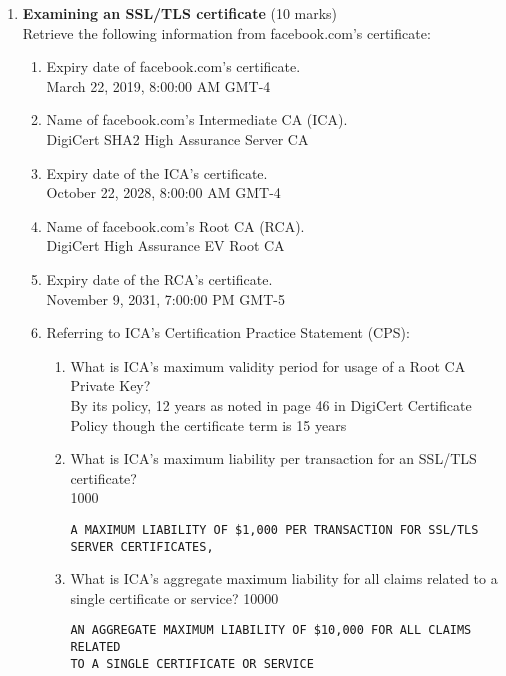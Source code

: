 \documentclass[11pt]{article}
\begin{document}
\begin{enumerate}
\begin{enumerate}
\end{enumerate}

\item {\bf Examining an SSL/TLS certificate} (10 marks)\\
Retrieve the following information from facebook.com's certificate:
\begin{enumerate}
\item Expiry date of facebook.com's certificate.\\
March 22, 2019, 8:00:00 AM GMT-4
\item Name of facebook.com's Intermediate CA (ICA).\\
DigiCert SHA2 High Assurance Server CA
\item Expiry date of the ICA's certificate.\\
October 22, 2028, 8:00:00 AM GMT-4
\item Name of facebook.com's Root CA (RCA).\\
DigiCert High Assurance EV Root CA
\item Expiry date of the RCA's certificate.\\
November 9, 2031, 7:00:00 PM GMT-5
\item Referring to ICA's Certification Practice Statement (CPS):
\begin{enumerate}
\item What is ICA's maximum validity period for usage of a Root CA Private Key?\\
By its policy, 12 years as noted in page 46 in DigiCert Certificate Policy though the certificate term is 15 years
\item What is ICA's maximum liability per transaction for an SSL/TLS
certificate?\\
1000
\begin{verbatim}
A MAXIMUM LIABILITY OF $1,000 PER TRANSACTION FOR SSL/TLS
SERVER CERTIFICATES,
\end{verbatim}

\item What is ICA's aggregate maximum liability for all claims related
to a single certificate or service?
10000
\begin{verbatim}
AN AGGREGATE MAXIMUM LIABILITY OF $10,000 FOR ALL CLAIMS RELATED
TO A SINGLE CERTIFICATE OR SERVICE
\end{verbatim}
\end{enumerate}
\end{enumerate}

\end{enumerate}
\end{document}
